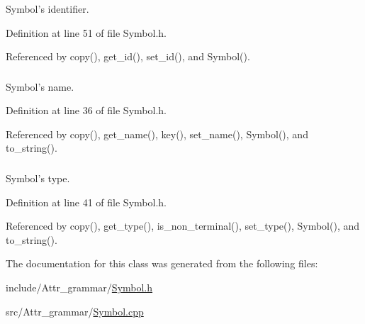 Symbol's identifier. 



Definition at line 51 of file Symbol.h.

Referenced by copy(), get\_\-id(), set\_\-id(), and Symbol().\hypertarget{classgenevalmag_1_1Symbol_72161dc9f286b5b4e18c4f849de52ebd}{
\subsubsection[{symb\_\-name}]{}}
\label{classgenevalmag_1_1Symbol_72161dc9f286b5b4e18c4f849de52ebd}


Symbol's name. 



Definition at line 36 of file Symbol.h.

Referenced by copy(), get\_\-name(), key(), set\_\-name(), Symbol(), and to\_\-string().\hypertarget{classgenevalmag_1_1Symbol_a8557500c1049fa8605e3ecebb27f89c}{
\subsubsection[{symb\_\-type}]{}}
\label{classgenevalmag_1_1Symbol_a8557500c1049fa8605e3ecebb27f89c}


Symbol's type. 



Definition at line 41 of file Symbol.h.

Referenced by copy(), get\_\-type(), is\_\-non\_\-terminal(), set\_\-type(), Symbol(), and to\_\-string().

The documentation for this class was generated from the following files:\begin{CompactItemize}
\item 
include/Attr\_\-grammar/\hyperlink{Symbol_8h}{Symbol.h}\item 
src/Attr\_\-grammar/\hyperlink{Symbol_8cpp}{Symbol.cpp}\end{CompactItemize}

